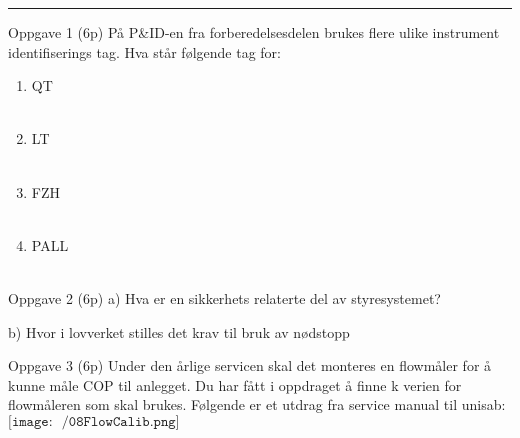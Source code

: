 \hrule
\vfil \eject
Oppgave 1 (6p)%
\vskip 2.5pt 
På P\&ID-en fra forberedelsesdelen brukes flere ulike instrument identifiserings tag. Hva står følgende tag for:\begin{enumerate}
	\item QT \\\\
	\item LT\\\\
	\item FZH\\\\
	\item PALL\\\\
\end{enumerate}


\vskip 2.5pt 


Oppgave 2 (6p) %
\vskip 2.5pt 
a) Hva er en sikkerhets relaterte del av styresystemet? \\
\vskip 2.5pt 
\vskip 2.5pt 
b) Hvor i lovverket stilles det krav til bruk av nødstopp \\
\vskip 2.5pt 
\vskip 2.5pt 
\newpage
Oppgave 3 (6p)%
\vskip 2.5pt 
Under den årlige servicen skal det monteres en flowmåler for å kunne måle COP til anlegget. Du har fått i oppdraget å finne k verien for flowmåleren som skal brukes. 
Følgende er et utdrag fra service manual til unisab:
\vskip 15pt 
$\texttt{[image: ~/08FlowCalib.png]}$\\

